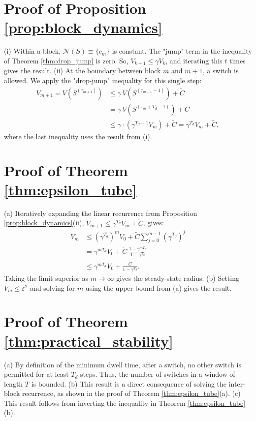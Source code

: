 \documentclass[journal]{IEEEtran}
\begin{document}
\section{Proof of Proposition \ref{prop:block_dynamics}}
\label{app:proof_prop_block_dynamics}
\begin{IEEEproof}
(i) Within a block, $\mathcal N(S)\equiv\{c_m\}$ is constant. The "jump" term in the inequality of Theorem \ref{thm:drop_jump} is zero. So, $V_{k+1}\le \gamma V_k$, and iterating this $t$ times gives the result.
(ii) At the boundary between block $m$ and $m+1$, a switch is allowed. We apply the "drop-jump" inequality for this single step:
\begin{equation}
\begin{split}
V_{m+1} = V(S^{(\tau_{m+1})}) & \le \gamma\,V(S^{(\tau_{m+1}-1)}) + \tilde C \\
& = \gamma\,V(S^{(\tau_m+T_d-1)}) + \tilde C \\
& \le \gamma \cdot (\gamma^{T_d-1}V_m) + \tilde C = \gamma^{T_d}V_m + \tilde C,
\end{split}
\end{equation}
where the last inequality uses the result from (i).
\end{IEEEproof}

\section{Proof of Theorem \ref{thm:epsilon_tube}}
\label{app:proof_thm_epsilon_tube}
\begin{IEEEproof}
(a) Iteratively expanding the linear recurrence from Proposition \ref{prop:block_dynamics}(ii), $V_{m+1}\le \gamma^{T_d}V_m+\tilde C$, gives:
\begin{equation}
\begin{split}
V_m &\le (\gamma^{T_d})^m V_0 + \tilde C \sum_{j=0}^{m-1}(\gamma^{T_d})^j \\
    &= \gamma^{mT_d}V_0 + \tilde C\,\frac{1-\gamma^{mT_d}}{1-\gamma^{T_d}} \\
    &\le \gamma^{mT_d}V_0+\frac{\tilde C}{1-\gamma^{T_d}}.
\end{split}
\end{equation}
Taking the limit superior as $m\to\infty$ gives the steady-state radius.
(b) Setting $V_m\le \varepsilon^2$ and solving for $m$ using the upper bound from (a) gives the result.
\end{IEEEproof}

\section{Proof of Theorem \ref{thm:practical_stability}}
\label{app:proof_thm_practical_stability}
\begin{IEEEproof}
(a) By definition of the minimum dwell time, after a switch, no other switch is permitted for at least $T_d$ steps. Thus, the number of switches in a window of length $T$ is bounded.
(b) This result is a direct consequence of solving the inter-block recurrence, as shown in the proof of Theorem \ref{thm:epsilon_tube}(a).
(c) This result follows from inverting the inequality in Theorem \ref{thm:epsilon_tube}(b).
\end{IEEEproof}
\end{document}
